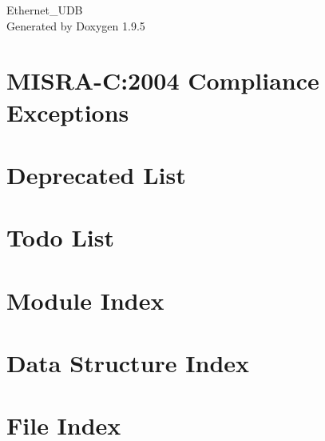 \documentclass[twoside]{book}
\newcommand{\+}{\discretionary{\mbox{\scriptsize$\hookleftarrow$}}{}{}}
\newcommand{\clearemptydoublepage}{%
    \newpage{\pagestyle{empty}\cleardoublepage}%
  }
\begin{document}
  \raggedbottom
    \hypersetup{pageanchor=false,
                bookmarksnumbered=true,
                pdfencoding=unicode
               }
  \begin{titlepage}
  \vspace*{7cm}
  \begin{center}%
  {\Large Ethernet\+\_\+\+UDB}\\
  \vspace*{1cm}
  {\large Generated by Doxygen 1.9.5}\\
  \end{center}
  \end{titlepage}
  \clearemptydoublepage
  \tableofcontents
  \clearemptydoublepage
  \hypersetup{pageanchor=true}
\chapter{MISRA-\/C\+:2004 Compliance Exceptions}
\label{_c_m_s_i_s__m_i_s_r_a__exceptions}

\chapter{Deprecated List}
\label{deprecated}

\chapter{Todo List}
\label{todo}

\chapter{Module Index}

\chapter{Data Structure Index}

\chapter{File Index}

\end{document}
